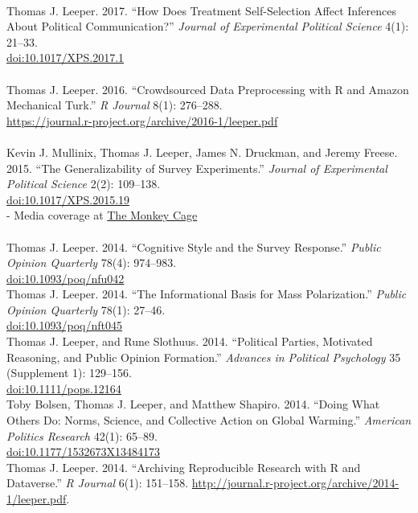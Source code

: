 \documentclass[12pt]{article}
\newcommand{\topic}[1]{\pagebreak[3]\indent {\color{lg}{\footnotesize #1 }}\\}
\newcommand{\entry}[1]{\indent {\color{lg}\guillemotright}\hspace{2pt}#1\vspace{.25em}\\}
\newcommand{\subentry}[1]{{\color{lg}-} #1\vspace{.25em}\\}
\begin{document}
\topic{Peer-Reviewed Publications: 2017}
    \entry{Thomas J. Leeper. 2017. ``How Does Treatment Self-Selection Affect Inferences About Political Communication?'' \textit{Journal of Experimental Political Science} 4(1): 21--33.\\ \href{http://doi.org/10.1017/XPS.2017.1}{doi:10.1017/XPS.2017.1}}

\topic{Peer-Reviewed Publications: 2016}
	\entry{Thomas J. Leeper. 2016. ``Crowdsourced Data Preprocessing with R and Amazon Mechanical Turk.'' \textit{R Journal} 8(1): 276--288.\\ \href{https://journal.r-project.org/archive/2016-1/leeper.pdf}{https://journal.r-project.org/archive/2016-1/leeper.pdf}}

\topic{Peer-Reviewed Publications: 2015}
	\entry{Kevin J. Mullinix, Thomas J. Leeper, James N. Druckman, and Jeremy Freese. 2015. ``The Generalizability of Survey Experiments.'' \textit{Journal of Experimental Political Science} 2(2): 109--138.\\ \href{http://doi.org/10.1017/XPS.2015.19}{doi:10.1017/XPS.2015.19}}
		\subentry{Media coverage at \href{https://www.washingtonpost.com/news/monkey-cage/wp/2016/03/09/does-social-science-have-a-replication-crisis/}{The Monkey Cage}}

\topic{Peer-Reviewed Publications: 2014}
	\entry{Thomas J. Leeper. 2014. ``Cognitive Style and the Survey Response.'' \textit{Public Opinion Quarterly} 78(4): 974--983.\\ \href{http://doi.org/10.1093/poq/nfu042}{doi:10.1093/poq/nfu042}}
	\entry{Thomas J. Leeper. 2014. ``The Informational Basis for Mass Polarization.'' \textit{Public Opinion Quarterly} 78(1): 27--46.\\ \href{http://doi.org/10.1093/poq/nft045}{doi:10.1093/poq/nft045}}
	\entry{Thomas J. Leeper, and Rune Slothuus. 2014. ``Political Parties, Motivated Reasoning, and Public Opinion Formation.'' \textit{Advances in Political Psychology} 35 (Supplement 1): 129--156.\\ \href{http://doi.org/10.1111/pops.12164}{doi:10.1111/pops.12164}}
	\entry{Toby Bolsen, Thomas J. Leeper, and Matthew Shapiro. 2014. ``Doing What Others Do: Norms, Science, and Collective Action on Global Warming.'' \textit{American Politics Research} 42(1): 65--89.\\ \href{http://doi.org/10.1177/1532673X13484173}{doi:10.1177/1532673X13484173}}
	\entry{Thomas J. Leeper. 2014. ``Archiving Reproducible Research with R and Dataverse.'' \textit{R Journal} 6(1): 151--158. \href{http://journal.r-project.org/archive/2014-1/leeper.pdf}{http://journal.r-project.org/archive/2014-1/leeper.pdf}.}
\end{document}

